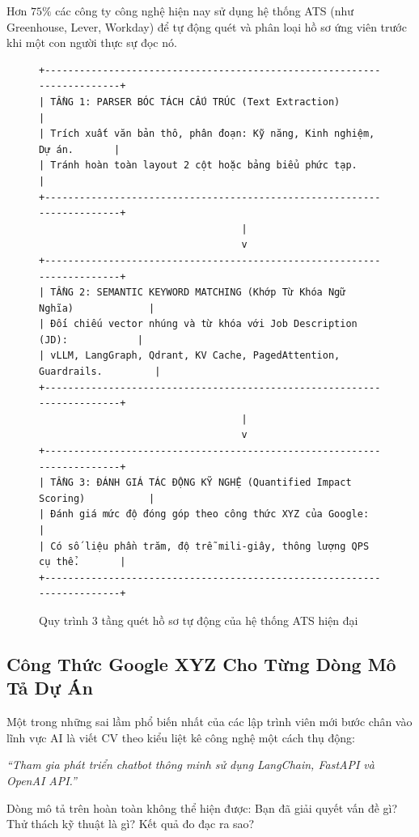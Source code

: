 Hơn $75\%$ các công ty công nghệ hiện nay sử dụng hệ thống ATS (như Greenhouse, Lever, Workday) để tự động quét và phân loại hồ sơ ứng viên trước khi một con người thực sự đọc nó.

\begin{figure}[htbp]
\centering
\small
\begin{verbatim}
+------------------------------------------------------------------------+
| TẦNG 1: PARSER BÓC TÁCH CẤU TRÚC (Text Extraction)                     |
| Trích xuất văn bản thô, phân đoạn: Kỹ năng, Kinh nghiệm, Dự án.       |
| Tránh hoàn toàn layout 2 cột hoặc bảng biểu phức tạp.                 |
+------------------------------------------------------------------------+
                                   |
                                   v
+------------------------------------------------------------------------+
| TẦNG 2: SEMANTIC KEYWORD MATCHING (Khớp Từ Khóa Ngữ Nghĩa)             |
| Đối chiếu vector nhúng và từ khóa với Job Description (JD):            |
| vLLM, LangGraph, Qdrant, KV Cache, PagedAttention, Guardrails.         |
+------------------------------------------------------------------------+
                                   |
                                   v
+------------------------------------------------------------------------+
| TẦNG 3: ĐÁNH GIÁ TÁC ĐỘNG KỸ NGHỆ (Quantified Impact Scoring)           |
| Đánh giá mức độ đóng góp theo công thức XYZ của Google:                |
| Có số liệu phần trăm, độ trễ mili-giây, thông lượng QPS cụ thể.       |
+------------------------------------------------------------------------+
\end{verbatim}
\caption{Quy trình 3 tầng quét hồ sơ tự động của hệ thống ATS hiện đại}
\label{fig:ats-pipeline}
\end{figure}

\subsection{Công Thức Google XYZ Cho Từng Dòng Mô Tả Dự Án}
Một trong những sai lầm phổ biến nhất của các lập trình viên mới bước chân vào lĩnh vực AI là viết CV theo kiểu liệt kê công nghệ một cách thụ động:
\begin{center}
\textit{``Tham gia phát triển chatbot thông minh sử dụng LangChain, FastAPI và OpenAI API.''}
\end{center}
Dòng mô tả trên hoàn toàn không thể hiện được: Bạn đã giải quyết vấn đề gì? Thử thách kỹ thuật là gì? Kết quả đo đạc ra sao?

